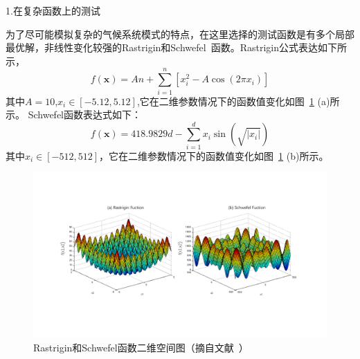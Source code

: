    1.在复杂函数上的测试
   
     为了尽可能模拟复杂的气候系统模式的特点，在这里选择的测试函数是有多个局部最优解，非线性变化较强的Rastrigin和Schwefel~\cite{pohlheim2007examples}函数。Rastrigin公式表达如下所示，
\begin{equation}
\label{equ:Rasfuc}
f ( \mathbf { x } ) = A n + \sum _ { i = 1 } ^ { n } \left[ x _ { i } ^ { 2 } - A \cos \left( 2 \pi x _ { i } \right) \right]
\end{equation}     
     其中$A = 10$,$x _ { i } \in [ - 5.12,5.12 ]$,它在二维参数情况下的函数值变化如图~\ref{fig:sofunctionspace} (a)所示。
Schwefel函数表达式如下：
\begin{equation}
\label{equ:Rasfuc}
     f ( \mathbf { x } ) = 418.9829 d - \sum _ { i = 1 } ^ { d } x _ { i } \sin \left( \sqrt { \left| x _ { i } \right| } \right)
\end{equation} 
其中$x _ { i } \in [ - 512,512 ]$，它在二维参数情况下的函数值变化如图~\ref{fig:sofunctionspace} (b)所示。

\begin{figure}[H] %
  \centering
  \includegraphics[scale=0.5,trim=10 90 10 100,clip]{figures/fuctionspace.pdf}
  \caption{Rastrigin和Schwefel函数二维空间图（摘自文献~\cite{optfun1,optfun2}）}
  \label{fig:sofunctionspace}
\end{figure}

